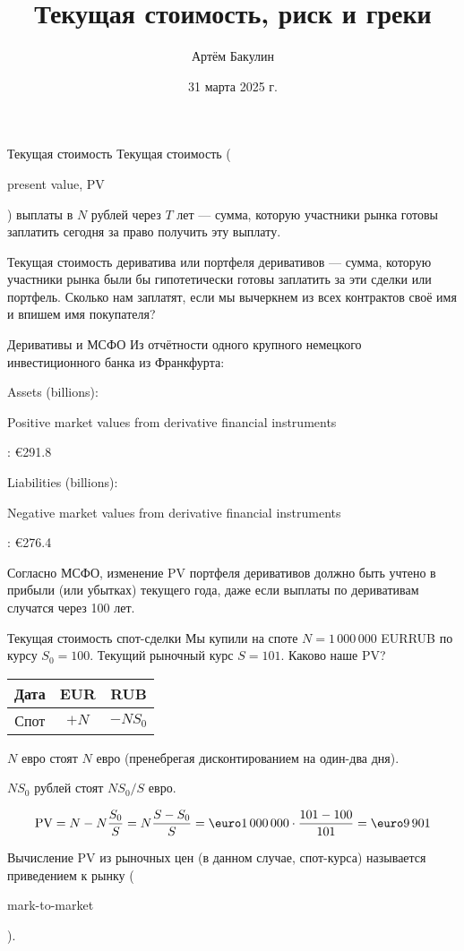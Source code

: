 \documentclass{beamer}
\title{Текущая стоимость, риск и греки}
\author{Артём Бакулин}
\date{31 марта 2025 г.}
\renewcommand{\EUR}[1]{\textup{\euro}#1}
\newcommand{\en}[1]{\begin{otherlanguage}{english}#1\end{otherlanguage}}
\begin{document}
\begin{frame}
\titlepage
\end{frame}



\begin{frame}{Текущая стоимость}
\justify
\alert{Текущая стоимость} (\en{present value, PV}) выплаты в $N$ рублей через $T$ лет 
--- сумма, которую участники рынка готовы заплатить сегодня за право получить эту 
выплату.

\justify
Текущая стоимость дериватива или портфеля деривативов --- сумма, которую участники рынка были бы гипотетически готовы заплатить за эти сделки или портфель. Сколько нам заплатят, если мы вычеркнем из всех контрактов своё имя и впишем имя покупателя?

\end{frame}



\begin{frame}{Деривативы и МСФО}
\justify
Из отчётности одного крупного немецкого инвестиционного банка из Франкфурта:

\justify
Assets (billions):

\en{Positive market values from derivative financial instruments}: \EUR{291.8}

\justify
Liabilities (billions):

\en{Negative market values from derivative financial instruments}: \EUR{276.4}

\justify
Согласно МСФО, изменение PV портфеля деривативов должно быть учтено в прибыли (или убытках) текущего года, даже если выплаты по деривативам случатся через 100 лет.
\end{frame}



\begin{frame}{Текущая стоимость спот-сделки}
\justify
Мы купили на споте $N=1\,000\,000$ EURRUB по курсу $S_0 = 100$. Текущий рыночный курс $S=101$. Каково наше PV?

\justify
\centering
\begin{tabular}{c|c|c}
Дата & EUR  & RUB \\ \hline
Спот & $+N$ & $-NS_0$
\end{tabular}

\justify
$N$ евро стоят $N$ евро (пренебрегая дисконтированием на один-два дня).

\justify
$NS_0$ рублей стоят $NS_0/S$ евро.

\begin{align*}
\text{PV} = N - N\frac{S_0}{S} = N\frac{S - S_0}{S} = \EUR{1\,000\,000} \cdot \frac{101 - 100}{101} = \EUR{9\,901}
\end{align*}

\justify
Вычисление PV из рыночных цен (в данном случае, спот-курса) называется \alert{приведением к рынку} (\en{mark-to-market}).
\end{frame}
\end{document}
